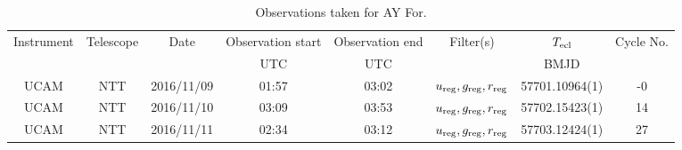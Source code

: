\begin{table}
	\begin{center}
		\caption{Observations taken for AY For.}
		\label{table:observing:observation logs AYFor}
		\begin{tabular}{cccccccc}
			\hline
			Instrument & Telescope & Date & Observation start & Observation end & Filter(s) & $T_{\rm ecl}$ & Cycle No. \\
			 &  &  & UTC & UTC &  & BMJD &  \\
			\hline
			\hline
			UCAM & NTT & 2016/11/09 & 01:57 & 03:02 & $u_{\rm reg},g_{\rm reg},r_{\rm reg}$ & 57701.10964(1)                                                                                                            &                                          -0 \\
			UCAM & NTT & 2016/11/10 & 03:09 & 03:53 & $u_{\rm reg},g_{\rm reg},r_{\rm reg}$ & 57702.15423(1)                                                                                                            &                                          14 \\
			UCAM & NTT & 2016/11/11 & 02:34 & 03:12 & $u_{\rm reg},g_{\rm reg},r_{\rm reg}$ & 57703.12424(1)                                                                                                            &                                          27 \\
		   \hline
		\end{tabular}
	\end{center}
\end{table}